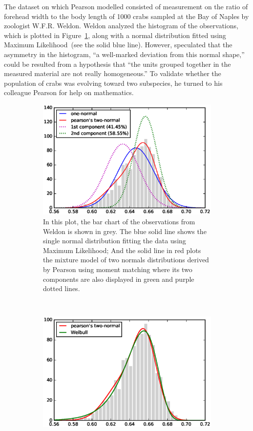 The dataset on which Pearson modelled consisted of measurement on the ratio of
forehead width to the body length of 1000 crabs sampled at the Bay of Naples by
zoologist W.F.R. Weldon. Weldon analyzed the histogram of the observations,
which is plotted in Figure~\ref{fig::pearson-crab}, along with a normal
distribution fitted using Maximum Likelihood~(see the solid blue line). However,
\citet{weldon1893certain} speculated that the asymmetry in the histogram, ``a
well-marked deviation from this normal shape,'' could be resulted from a
hypothesis that ``the units grouped together in the measured material are not
really homogeneous.'' To validate whether the population of crabs was evolving
toward two subspecies, he turned to his colleague Pearson for help on
mathematics.

\begin{figure}[ht!]
  \centering
  \begin{subfigure}[b]{0.95\textwidth}
  \centering
  \includegraphics[width=0.8\linewidth]{figures/pearson-crab.eps}
  \caption{In this plot, the bar chart of the observations from Weldon is shown
    in grey. The blue solid line shows the single normal distribution fitting
    the data using Maximum Likelihood; And the solid line in red plots the
    mixture model of two normals distributions derived by Pearson using moment
    matching where its two components are also displayed in green and purple
    dotted lines.}
  \label{fig::pearson-crab}
  \end{subfigure}
  ~
  \begin{subfigure}[b]{0.95\textwidth}
  \centering
  \includegraphics[width=0.8\linewidth]{figures/pearson-crab-weibull.eps}

\end{subfigure}
\end{figure}
